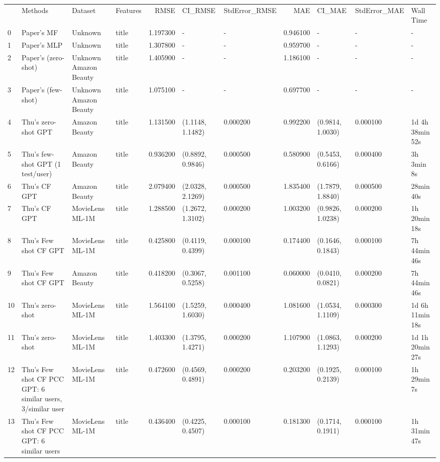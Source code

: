 \begin{tabular}{llllrllrlll}
 & Methods & Dataset & Features & RMSE & CI_RMSE & StdError_RMSE & MAE & CI_MAE & StdError_MAE & Wall Time \\
0 & Paper's MF & Unknown & title & 1.197300 & - & - & 0.946100 & - & - & - \\
1 & Paper's MLP & Unknown & title & 1.307800 & - & - & 0.959700 & - & - & - \\
2 & Paper's (zero-shot) & Unknown Amazon Beauty & title & 1.405900 & - & - & 1.186100 & - & - & - \\
3 & Paper's (few-shot) & Unknown Amazon Beauty & title & 1.075100 & - & - & 0.697700 & - & - & - \\
4 & Thu's zero-shot GPT & Amazon Beauty & title & 1.131500 & (1.1148, 1.1482) & 0.000200 & 0.992200 & (0.9814, 1.0030) & 0.000100 & 1d 4h 38min 52s \\
5 & Thu's few-shot GPT (1 test/user) & Amazon Beauty & title & 0.936200 & (0.8892, 0.9846) & 0.000500 & 0.580900 & (0.5453, 0.6166) & 0.000400 & 3h 3min 8s \\
6 & Thu's CF GPT & Amazon Beauty & title & 2.079400 & (2.0328, 2.1269) & 0.000500 & 1.835400 & (1.7879, 1.8840) & 0.000500 & 28min 40s \\
7 & Thu's CF GPT & MovieLens ML-1M & title & 1.288500 & (1.2672, 1.3102) & 0.000200 & 1.003200 & (0.9826, 1.0238) & 0.000200 & 1h 20min 18s \\
8 & Thu's Few shot CF GPT & MovieLens ML-1M & title & 0.425800 & (0.4119, 0.4399) & 0.000100 & 0.174400 & (0.1646, 0.1843) & 0.000100 & 7h 44min 46s \\
9 & Thu's Few shot CF GPT & Amazon Beauty & title & 0.418200 & (0.3067, 0.5258) & 0.001100 & 0.060000 & (0.0410, 0.0821) & 0.000200 & 7h 44min 46s \\
10 & Thu's zero-shot & MovieLens ML-1M & title & 1.564100 & (1.5259, 1.6030) & 0.000400 & 1.081600 & (1.0534, 1.1109) & 0.000300 & 1d 6h 11min 18s \\
11 & Thu's zero-shot & MovieLens ML-1M & title & 1.403300 & (1.3795, 1.4271) & 0.000200 & 1.107900 & (1.0863, 1.1293) & 0.000200 & 1d 1h 20min 27s \\
12 & Thu's Few shot CF PCC GPT: 6 similar users, 3/similar user & MovieLens ML-1M & title & 0.472600 & (0.4569, 0.4891) & 0.000200 & 0.203200 & (0.1925, 0.2139) & 0.000100 & 1h 29min 7s \\
13 & Thu's Few shot CF PCC GPT: 6 similar users & MovieLens ML-1M & title & 0.436400 & (0.4225, 0.4507) & 0.000100 & 0.181300 & (0.1714, 0.1911) & 0.000100 & 1h 31min 47s \\

\end{tabular}
